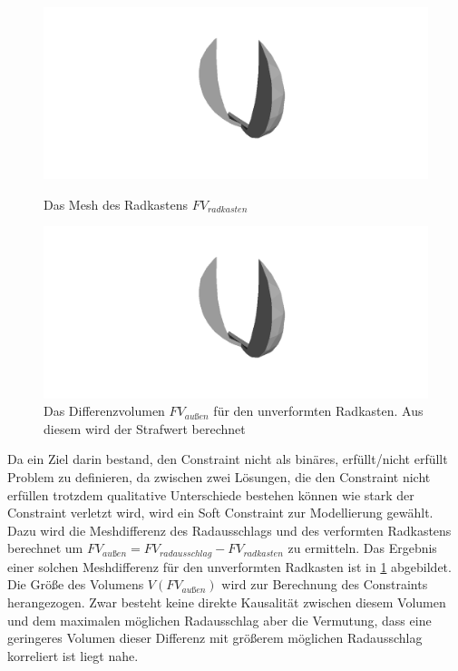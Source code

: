 \begin{figure}[h]
	\centering
	\begin{minipage}{0.45\textwidth}
		\centering
		\includegraphics[width=.5\linewidth]{bilder/difference.png}
		\caption{Das Mesh des Radkastens $FV_{radkasten}$}
		\label{fig:wheelcase}
	\end{minipage}\hfill
	\begin{minipage}{0.45\textwidth}
		\centering
		\includegraphics[width=.5\linewidth]{bilder/difference.png}
		\caption{Das Differenzvolumen $FV_{außen}$ für den unverformten Radkasten. Aus diesem wird der Strafwert berechnet}
		\label{fig:diff_volume}
	\end{minipage}
\end{figure}
Da ein Ziel darin bestand, den Constraint nicht als binäres, erfüllt/nicht erfüllt Problem zu definieren, da zwischen zwei Lösungen, die den Constraint nicht erfüllen trotzdem qualitative Unterschiede bestehen können wie stark der Constraint verletzt wird, wird ein Soft Constraint zur Modellierung gewählt.
Dazu wird die Meshdifferenz des Radausschlags und des verformten Radkastens berechnet um $FV_{außen} = FV_{radausschlag} - FV_{radkasten}$ zu ermitteln.
Das Ergebnis einer solchen Meshdifferenz für den unverformten Radkasten ist in \cref{fig:diff_volume} abgebildet.
Die Größe des Volumens $V(FV_{außen})$ wird zur Berechnung des Constraints herangezogen.
Zwar besteht keine direkte Kausalität zwischen diesem Volumen und dem maximalen möglichen Radausschlag aber die Vermutung, dass eine geringeres Volumen dieser Differenz mit größerem möglichen Radausschlag korreliert ist liegt nahe.


